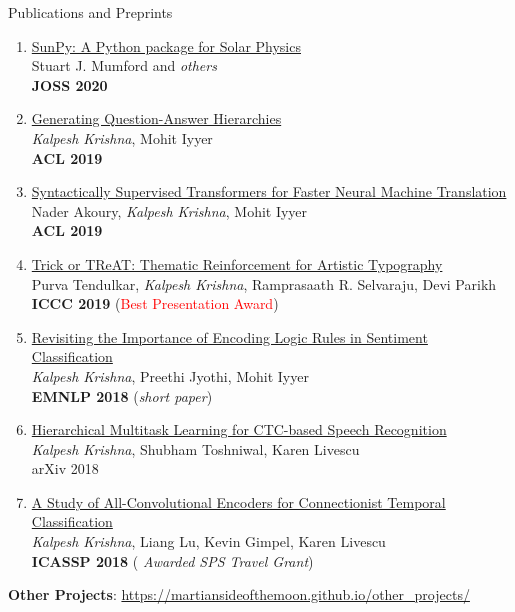 \documentclass{resume} %
\begin{document}
\begin{rSection}{Publications and Preprints}
\begin{enumerate}[leftmargin=*]
\item \href{https://joss.theoj.org/papers/10.21105/joss.01832}{SunPy: A Python package for Solar Physics} \\ Stuart J. Mumford and \textit{others} \\ \textbf{JOSS 2020}

\item \href{https://arxiv.org/abs/1906.02622}{Generating Question-Answer Hierarchies} \\ \textit{Kalpesh Krishna}, Mohit Iyyer \\ \textbf{ACL 2019}

\item \href{https://arxiv.org/abs/1906.02780}{Syntactically Supervised Transformers for Faster Neural Machine Translation} \\ Nader Akoury, \textit{Kalpesh Krishna}, Mohit Iyyer \\ \textbf{ACL 2019}
\item \href{https://arxiv.org/abs/1903.07820}{Trick or TReAT: Thematic Reinforcement for Artistic Typography} \\ Purva Tendulkar, \textit{Kalpesh Krishna}, Ramprasaath R. Selvaraju, Devi Parikh \\ \textbf{ICCC 2019} (\textcolor{red}{Best Presentation Award})
\item \href{https://arxiv.org/abs/1808.07733}{Revisiting the Importance of Encoding Logic Rules in Sentiment Classification} \\ \textit{Kalpesh Krishna}, Preethi Jyothi, Mohit Iyyer \\ \textbf{EMNLP 2018} (\textit{short paper})
\item \href{https://arxiv.org/abs/1807.06234}{Hierarchical Multitask Learning for CTC-based Speech Recognition} \\ \textit{Kalpesh Krishna}, Shubham Toshniwal, Karen Livescu \\
arXiv 2018
\item \href{https://arxiv.org/abs/1710.10398}{A Study of All-Convolutional Encoders for Connectionist Temporal Classification}\\ \textit{Kalpesh Krishna}, Liang Lu, Kevin Gimpel,  Karen Livescu\\ \textbf{ICASSP 2018} ({ \textit{Awarded SPS Travel Grant}})
%
\end{enumerate}

\textbf{Other Projects}: \url{https://martiansideofthemoon.github.io/other_projects/}
\end{rSection}
\end{document}
